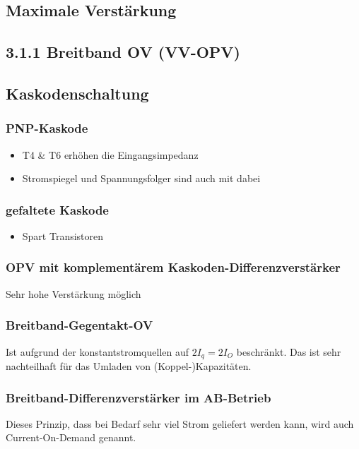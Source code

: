\documentclass[a5paper]{article}
\begin{document}
\subsection*{Maximale Verstärkung}

\subsection*{3.1.1 Breitband OV (VV-OPV)}

\subsection*{Kaskodenschaltung}
\subsubsection*{PNP-Kaskode}
\begin{itemize}
    \item T4 \& T6 erhöhen die Eingangsimpedanz
    \item Stromspiegel und Spannungsfolger sind auch mit dabei
\end{itemize}
\subsubsection*{gefaltete Kaskode}
\begin{itemize}
    \item Spart Transistoren
\end{itemize}

\subsubsection*{OPV mit komplementärem Kaskoden-Differenzverstärker}
Sehr hohe Verstärkung möglich

\subsubsection*{Breitband-Gegentakt-OV}
Ist aufgrund der konstantstromquellen auf $2I_{q}=2I_{O}$ beschränkt. Das ist sehr nachteilhaft für das Umladen von (Koppel-)Kapazitäten.

\subsubsection*{Breitband-Differenzverstärker im AB-Betrieb}
Dieses Prinzip, dass bei Bedarf sehr viel Strom geliefert werden kann, wird auch Current-On-Demand genannt.
\end{document}
